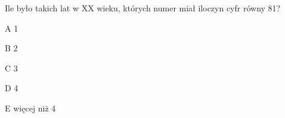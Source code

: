 \begin{tresc}
Ile było takich lat w XX wieku, których numer miał iloczyn cyfr równy 81?
\end{tresc}
\begin{wariant}{A} 1 \end{wariant}
\begin{wariant}{B} 2 \end{wariant}
\begin{wariant}{C} 3 \end{wariant}
\begin{wariant}{D} 4 \end{wariant}
\begin{wariant}{E} więcej niż 4 \end{wariant}
